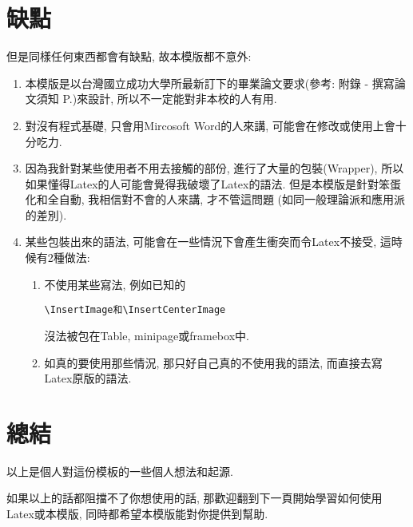 
\section{缺點}
但是同樣任何東西都會有缺點, 故本模版都不意外:

\begin{enumerate}

  \item
  {
    本模版是以台灣國立成功大學所最新訂下的畢業論文要求(參考: 附錄 - 撰寫論文須知 P.\pageref{appendix:thesis-spec})來設計, 所以不一定能對非本校的人有用.
  } %

  \item
  {
    對沒有程式基礎, 只會用Mircosoft Word的人來講, 可能會在修改或使用上會十分吃力.
  } %

  \item
  {
    因為我針對某些使用者不用去接觸的部份, 進行了大量的包裝(Wrapper), 所以如果懂得Latex的人可能會覺得我破壞了Latex的語法. 但是本模版是針對笨蛋化和全自動, 我相信對不會的人來講, 才不管這問題 (如同一般理論派和應用派的差別).
  } %

  \item
  {
    某些包裝出來的語法, 可能會在一些情況下會產生衝突而令Latex不接受, 這時候有2種做法:
    \begin{enumerate}
      \item
      {
        不使用某些寫法, 例如已知的\begin{verbatim}\InsertImage和\InsertCenterImage\end{verbatim}沒法被包在Table, minipage或framebox中.
      } %

      \item
      {
        如真的要使用那些情況, 那只好自己真的不使用我的語法, 而直接去寫Latex原版的語法.
      } %
    \end{enumerate}
  } %
\end{enumerate}


\section{總結}

以上是個人對這份模板的一些個人想法和起源.

如果以上的話都阻擋不了你想使用的話, 那歡迎翻到下一頁開始學習如何使用Latex或本模版, 同時都希望本模版能對你提供到幫助.

\EndChapter
